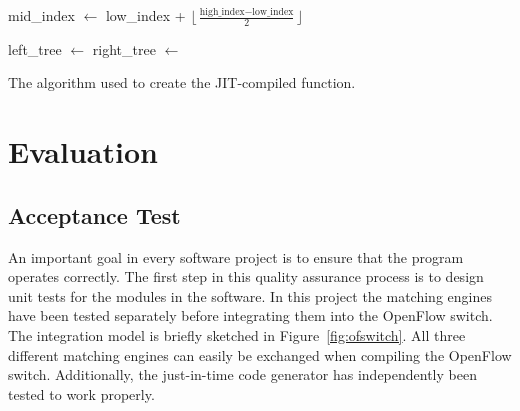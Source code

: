 \documentclass[a4paper,
		12pt,
		parskip=full,
		titlepage
		]{scrartcl}
\begin{document}
\begin{algorithm}
\begin{algorithmic}[1]
    \State mid\_index $\gets$ low\_index + $\lfloor\frac{\textrm{high\_index} - \textrm{low\_index}}{2}\rfloor$
    
    \State {}
        \State {}
        \State {}
        \State {}
        \State {} 
        \State {}
    \EndIf
    
    \State left\_tree $\gets$ 
    \State right\_tree $\gets$ 
    
    \State {}
    \State {}
    \State {}
    \State {}
    \State {}
    \State {}
    \State {}
    \State {}
\EndFunction
\end{algorithmic}
\caption{The algorithm used to create the JIT-compiled function.}
\label{alg:jit}
\end{algorithm}

\section{Evaluation}
\subsection{Acceptance Test}
An important goal in every software project is to ensure that the program operates correctly.
The first step in this quality assurance process is to design unit tests for the modules in the software.
In this project the matching engines have been tested separately before integrating them into the OpenFlow switch.
The integration model is briefly sketched in Figure~\ref{fig:ofswitch}.
All three different matching engines can easily be exchanged when compiling the OpenFlow switch.
Additionally, the just-in-time code generator has independently been tested to work properly.
\end{document}
